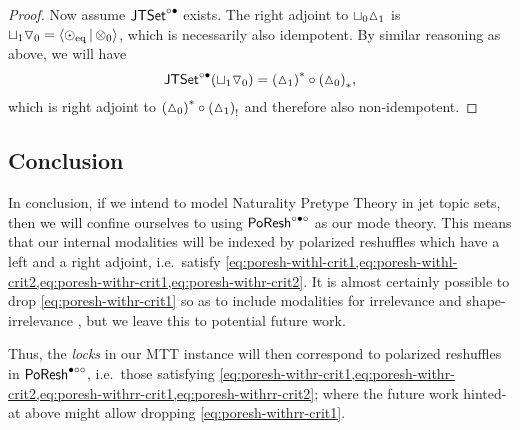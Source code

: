 \documentclass[a4paper]{memoir}
\begin{document}
\begin{proof}
	Now assume $\mathsf{JTSet}^{\circ \bullet}$ exists.
	The right adjoint to ${\sqcup}_0 {\vartriangle}_1$ is ${\sqcup}_1 {\triangledown}_0 = \mathopen{}\left\langle {\odot}_{\mathrm{eq}} \,\middle|\, {\otimes}_0 \right\rangle\mathclose{}$, which is necessarily also idempotent.
	By similar reasoning as above, we will have
	\[
		\mathsf{JTSet}^{\circ \bullet}({\sqcup}_1 {\triangledown}_0) = {({\vartriangle}_1)}^* \circ {({\vartriangle}_0)}_*,
	\]
	which is right adjoint to ${({\vartriangle}_0)}^* \circ {({\vartriangle}_1)}_!$ and therefore also non-idempotent.
\end{proof}

\subsection{Conclusion}
In conclusion, if we intend to model Naturality Pretype Theory in jet topic sets, then we will confine ourselves to using $\mathsf{PoResh}^{\circ \bullet \circ}$ as our mode theory.
This means that our internal modalities will be indexed by polarized reshuffles which have a left and a right adjoint, i.e.\ satisfy \cref{eq:poresh-withl-crit1,eq:poresh-withl-crit2,eq:poresh-withr-crit1,eq:poresh-withr-crit2}.
It is almost certainly possible to drop \cref{eq:poresh-withr-crit1} so as to include modalities for irrelevance and shape-irrelevance \cite{reldtt}, but we leave this to potential future work.

Thus, the \emph{locks} in our MTT instance will then correspond to polarized reshuffles in $\mathsf{PoResh}^{\bullet \circ \circ}$, i.e.\ those satisfying \cref{eq:poresh-withr-crit1,eq:poresh-withr-crit2,eq:poresh-withrr-crit1,eq:poresh-withrr-crit2}; where the future work hinted-at above might allow dropping \cref{eq:poresh-withrr-crit1}.

\end{document}
